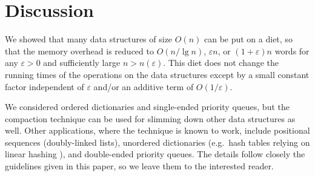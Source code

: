\documentclass{DIKU-article}
\newcommand{\seclabel}[1]{\label{sec:#1}}
\newcommand{\comment}[1]{}
\newcommand{\Findmin}{\mbox{$\mathit{find}$}\textnormal{-}\allowbreak{}\mbox{$\mathit{min}$}}
\newcommand{\Findmax}{\mbox{$\mathit{find}$}\textnormal{-}\allowbreak{}\mbox{$\mathit{max}$}}
\newcommand{\Insert}{\mbox{$\mathit{insert}$}}
\newcommand{\Erase}{\mbox{$\mathit{erase}$}}
\newcommand{\Borrow}{\mbox{$\mathit{borrow}$}}
\begin{document}
\section{Discussion}\seclabel{discussion}

We showed that many data structures of size $O(n)$ can be put on a
diet, so that the memory overhead is reduced to $O(n/\lg n)$,
$\varepsilon n$, or $(1 + \varepsilon)n$ words for any $\varepsilon >0$
and sufficiently large $n > n(\varepsilon)$. This diet does not change
the running times of the operations on the data structures except by a
small constant factor independent of $\varepsilon$ and/or an additive
term of $O(1/\varepsilon)$.

We considered ordered dictionaries and single-ended priority queues,
but the compaction technique can be used for slimming down other data
structures as well. Other applications, where the technique is known
to work, include positional sequences (doubly-linked lists), unordered
dictionaries (e.g.~hash tables relying on linear hashing
\cite{Lit80}), and double-ended priority queues.  The details follow
closely the guidelines given in this paper, so we leave them
to the interested reader.

\comment{
\begin{theorem}
A positional sequence, which provides location-based updates and
bidirectional iterators, can be transformed into an equivalent data
structure that uses $(1 + \varepsilon)n$ words of memory, for any
$\varepsilon > 0$ and sufficiently large $n > n(\varepsilon)$,
excluding the space used by the $n$ elements stored. This
transformation only slows down the running time of the supported
operations by an additive term of $O(1/\varepsilon)$.
\end{theorem}

\begin{theorem}
An unordered dictionary, which relies on chaining and provides member
searches and updates, can be transformed into an equivalent data
structure that uses $(1 + \varepsilon)n$ words of extra storage, for
any $\varepsilon > 0$ and sufficiently large $n > n(\varepsilon)$.
This transformation slows down the running time of the supported
operations by a \emph{multiplicative factor} of $O(1/\varepsilon)$,
except that the slowdown is an additive term of $O(1/\varepsilon)$ for
\Insert{} when a multiset is stored and for location-based \Erase{}.
\end{theorem}

\begin{theorem}
A doubly-ended priority queue, which uses $O(n)$ words of extra
storage and provides methods \Findmin{}, \Findmax{}, \Insert{},
\Borrow{}, and \Erase{}, can be transformed into an equivalent data
structure that uses $(1 + \varepsilon)n$ words of extra storage, for
any $\varepsilon > 0$ and sufficiently large $n > n(\varepsilon)$.
This transformation only slows down the running time of \Erase{} by an
additive term of $O(1/\varepsilon)$ and that of the other operations
by an additive term of $O(1)$.
\end{theorem}
}
\end{document}
